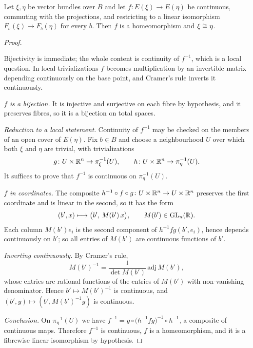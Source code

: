 \begin{lemma}\label{lem:fibrewise-iso}
Let $\xi,\eta$ be vector bundles over $B$ and let $f\colon E(\xi)\to E(\eta)$ be
continuous, commuting with the projections, and restricting to a linear
isomorphism $F_b(\xi)\to F_b(\eta)$ for every $b$. Then $f$ is a homeomorphism
and $\xi\cong\eta$.
\end{lemma}

\begin{proof}
\begin{strategy}
Bijectivity is immediate; the whole content is continuity of $f^{-1}$, which is
a local question. In local trivializations $f$ becomes multiplication by an
invertible matrix depending continuously on the base point, and Cramer's rule
inverts it continuously.
\end{strategy}

 \emph{$f$ is a bijection.} It is injective and surjective on each
fibre by hypothesis, and it preserves fibres, so it is a bijection on total
spaces.

 \emph{Reduction to a local statement.} Continuity of $f^{-1}$ may be
checked on the members of an open cover of $E(\eta)$. Fix $b\in B$ and choose a
neighbourhood $U$ over which both $\xi$ and $\eta$ are trivial, with
trivializations
\[
g\colon U\times\mathbb{R}^n\to\pi_\xi^{-1}(U),
\qquad
h\colon U\times\mathbb{R}^n\to\pi_\eta^{-1}(U).
\]
It suffices to prove that $f^{-1}$ is continuous on $\pi_\eta^{-1}(U)$.

 \emph{$f$ in coordinates.} The composite
$h^{-1}\circ f\circ g\colon U\times\mathbb{R}^n\to U\times\mathbb{R}^n$ preserves the first
coordinate and is linear in the second, so it has the form
\[
(b',x)\longmapsto\big(b',\,M(b')\,x\big),
\qquad M(b')\in\operatorname{GL}_n(\mathbb{R}).
\]
Each column $M(b')e_i$ is the second component of
$h^{-1}fg(b',e_i)$, hence depends continuously on $b'$; so all entries of
$M(b')$ are continuous functions of $b'$.

 \emph{Inverting continuously.} By Cramer's rule,
\[
M(b')^{-1}=\frac{1}{\det M(b')}\,\mathrm{adj}\,M(b'),
\]
whose entries are rational functions of the entries of $M(b')$ with non-vanishing
denominator. Hence $b'\mapsto M(b')^{-1}$ is continuous, and
$(b',y)\mapsto(b',M(b')^{-1}y)$ is continuous.

 \emph{Conclusion.} On $\pi_\eta^{-1}(U)$ we have
$f^{-1}=g\circ\big(h^{-1}fg\big)^{-1}\circ h^{-1}$, a composite of continuous
maps. Therefore $f^{-1}$ is continuous, $f$ is a homeomorphism, and it is a
fibrewise linear isomorphism by hypothesis.
\end{proof}

